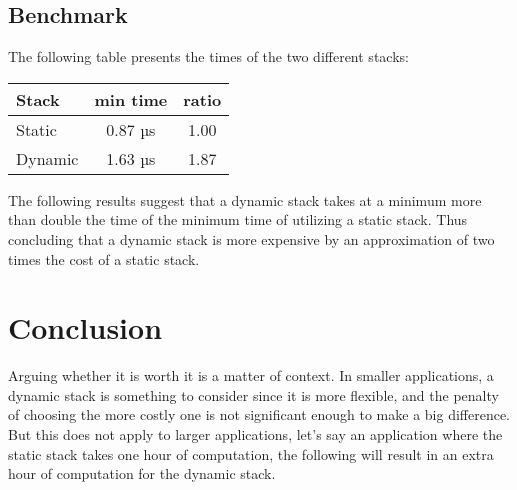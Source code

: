 \documentclass[a4paper,11pt]{article}
\begin{document}
\subsection*{Benchmark}

    The following table presents the times of the two different stacks:

\begin{table}[h]
\begin{center}
\begin{tabular}{l|c|c}
\textbf{Stack} & \textbf{min time} & \textbf{ratio}\\
\hline
  Static      &  0.87 µs & 1.00\\
  Dynamic     &  1.63 µs & 1.87\\
\end{tabular}
\end{center}
\end{table}
    The following results suggest that a dynamic stack takes at a minimum more than double the time of the minimum time of utilizing a static stack. Thus concluding that a dynamic stack is more expensive by an approximation of two times the cost of a static stack. 

\section*{Conclusion}
    
    Arguing whether it is worth it is a matter of context. In smaller applications, a dynamic stack is something to consider since it is more flexible, and the penalty of choosing the more costly one is not significant enough to make a big difference. But this does not apply to larger applications, let's say an application where the static stack takes one hour of computation, the following will result in an extra hour of computation for the dynamic stack.
    
\end{document}
